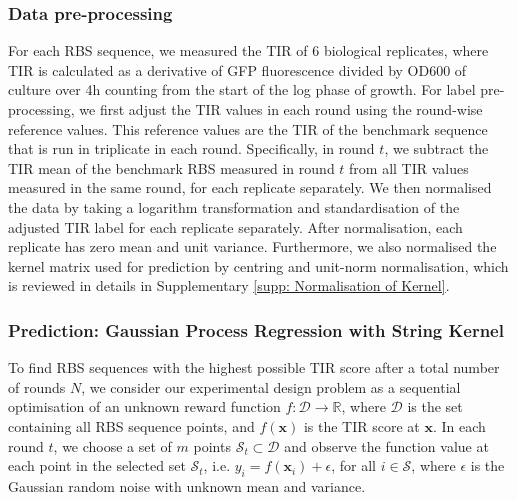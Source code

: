 \subsubsection{Data pre-processing}
\label{sec: method data pre-procesing}

For each RBS sequence, we measured the TIR of 6 biological replicates, where TIR is calculated as a derivative of GFP fluorescence divided by OD600 of culture over 4h counting from the start of the log phase of growth. 
For label pre-processing, we first adjust the TIR values in each round using the round-wise reference values.
This reference values are the TIR of the benchmark sequence that is run in triplicate in each round.
Specifically, in round $t$, we subtract the TIR mean of the benchmark RBS measured in round $t$ from all TIR values measured in the same round, for each replicate separately. 
We then normalised the data by taking a logarithm transformation and standardisation of the adjusted TIR label for each replicate separately.
After normalisation, each replicate has zero mean and unit variance. 
Furthermore, we also normalised the kernel matrix used for prediction by centring and unit-norm normalisation, which is reviewed in details in Supplementary \ref{supp: Normalisation of Kernel}.


\subsubsection{Prediction: Gaussian Process Regression with String Kernel}

To find RBS sequences with the highest possible TIR score after a total number of rounds $N$,  we consider our experimental design problem as a sequential optimisation of an unknown reward function $f: \mathcal{D} \rightarrow \mathbb{R}$, where $\mathcal{D}$ is the set containing all RBS sequence points, and $f(\mathbf{x})$ is the TIR score at $\mathbf{x}$. 
In each round $t$, we choose a set of $m$ points $\mathcal{S}_t \subset \mathcal{D}$ and observe the function value at each point in the selected set $\mathcal{S}_t$, i.e. $y_i = f(\mathbf{x}_i) + \epsilon$, for all $i \in \mathcal{S}$, where $\epsilon$ is the Gaussian random noise with unknown mean and variance. 

